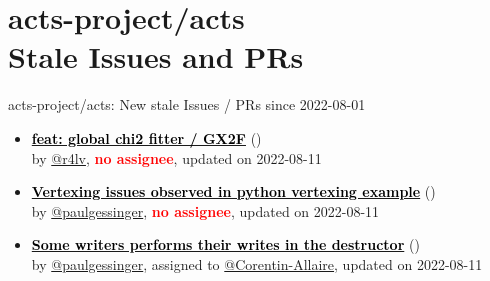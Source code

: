 \section{ acts-project/acts \\ Stale Issues and PRs}
\begin{frame}[allowframebreaks]{ acts-project/acts: New stale Issues / PRs since 2022-08-01 }
  \begin{itemize}
    
    \item\propen\prwip\prstale\textbf{\href{https://github.com/acts-project/acts/pull/1099}{\textcolor{black}{feat: global chi2 fitter / GX2F}}}
    (\href{https://github.com/acts-project/acts/pull/1099}{}) \\
    by \href{https://github.com/r4lv}{@r4lv}, {}\textbf{\textcolor{Red}{no assignee}}, updated on 2022-08-11

    \item\iss\prstale\textbf{\href{https://github.com/acts-project/acts/issues/1091}{\textcolor{black}{Vertexing issues observed in python vertexing example}}}
    (\href{https://github.com/acts-project/acts/issues/1091}{}) \\
    by \href{https://github.com/paulgessinger}{@paulgessinger}, {}\textbf{\textcolor{Red}{no assignee}}, updated on 2022-08-11

    \item\iss\prstale\textbf{\href{https://github.com/acts-project/acts/issues/881}{\textcolor{black}{Some writers performs their writes in the destructor}}}
    (\href{https://github.com/acts-project/acts/issues/881}{}) \\
    by \href{https://github.com/paulgessinger}{@paulgessinger}, {}assigned to \href{https://github.com/Corentin-Allaire}{@Corentin-Allaire}, updated on 2022-08-11

  \end{itemize}
\end{frame}



